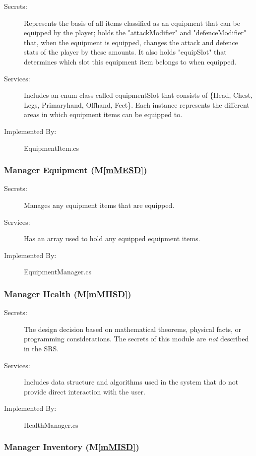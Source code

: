 \documentclass[12pt, titlepage]{article}
\newcommand{\mref}[1]{M\ref{#1}}
\begin{document}
\begin{description}
\item[Secrets:] Represents the basis of all items classified as an equipment that can be equipped by the player; holds the "attackModifier" and "defenceModifier" that, when the equipment is equipped, changes the attack and defence stats of the player by these amounts. It also holds "equipSlot" that determines which slot this equipment item belongs to when equipped.
\item[Services:] Includes an enum class called equipmentSlot that consists of \{Head, Chest, Legs, Primaryhand, Offhand, Feet\}. Each instance represents the different areas in which equipment items can be equipped to.
\item[Implemented By:] EquipmentItem.cs
\end{description}

\subsubsection{Manager Equipment (\mref{mMESD})}

\begin{description}
\item[Secrets:] Manages any equipment items that are equipped. 
\item[Services:] Has an array used to hold any equipped equipment items.
\item[Implemented By:] EquipmentManager.cs
\end{description}

\subsubsection{Manager Health (\mref{mMHSD})}

\begin{description}
\item[Secrets:] The design decision based on mathematical theorems, physical
  facts, or programming considerations. The secrets of this module are
  \emph{not} described in the SRS.
\item[Services:] Includes data structure and algorithms used in the system that
  do not provide direct interaction with the user. 
\item[Implemented By:] HealthManager.cs
\end{description}

\subsubsection{Manager Inventory (\mref{mMISD})}
\end{document}
